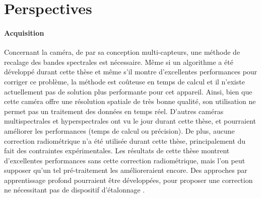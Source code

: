\documentclass[../thesis.tex]{subfiles}
\begin{document}
    
    \newpage
    \section{Perspectives}
    
    \paragraph{Acquisition} Concernant la caméra, de par sa conception multi-capteurs, une méthode de recalage des bandes spectrales est nécessaire. Même si un algorithme a été développé durant cette thèse et même s'il montre d'excellentes performances pour corriger ce problème, la méthode est coûteuse en temps de calcul et il n'existe actuellement pas de solution plus performante pour cet appareil. Ainsi, bien que cette caméra offre une résolution spatiale de très bonne qualité, son utilisation ne permet pas un traitement des données en temps réel. D'autres caméras multispectrales et hyperspectrales ont vu le jour durant cette thèse, et pourraient améliorer les performances (temps de calcul ou précision). De plus, aucune correction radiométrique n'a été utilisée durant cette thèse, principalement du fait des contraintes expérimentales. Les résultats de cette thèse montrent d'excellentes performances sans cette correction radiométrique, mais l'on peut supposer qu'un tel pré-traitement les amélioreraient encore. Des approches par apprentissage profond pourraient être développées, pour proposer une correction ne nécessitant pas de dispositif d'étalonnage \cite{DBLP:journals/corr/abs-1802-00153, tian2020deep}.
    
\end{document}
